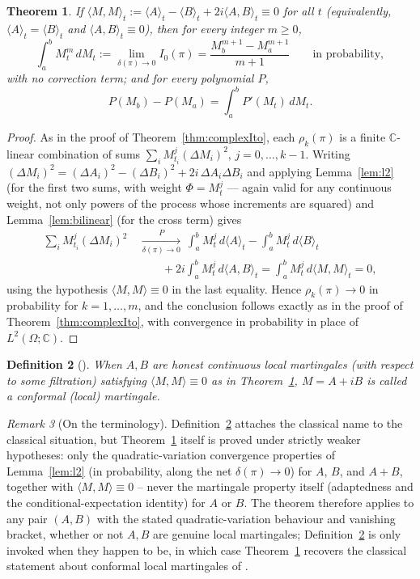 \documentclass[11pt,fleqn]{article}
\def\C{\mathbb C}
\theoremstyle{plain}
\newtheorem{thm}{Theorem}[section]
\newtheorem{definition}[thm]{Definition}
\theoremstyle{remark}
\newtheorem{remark}[thm]{Remark}
\begin{document}
\begin{thm}\label{thm:conformalIto}
If $\langle M,M\rangle_t:=\langle A\rangle_t-\langle B\rangle_t+2i\langle
A,B\rangle_t\equiv0$ for all $t$ (equivalently, $\langle A\rangle_t=
\langle B\rangle_t$ and $\langle A,B\rangle_t\equiv0$), then for every
integer $m\ge0$,
\[
\int_a^b M_t^m\,dM_t:=\lim_{\delta(\pi)\to0}I_0(\pi)=
\frac{M_b^{m+1}-M_a^{m+1}}{m+1}\qquad\text{in probability},
\]
with \emph{no} correction term; and for every polynomial $P$,
\[
P(M_b)-P(M_a)=\int_a^b P'(M_t)\,dM_t.
\]
\end{thm}

\begin{proof}
As in the proof of Theorem~\ref{thm:complexIto}, each $\rho_k(\pi)$ is a
finite $\C$-linear combination of sums $\sum_iM_{t_i}^j(\Delta M_i)^2$,
$j=0,\ldots,k-1$. Writing $(\Delta M_i)^2=(\Delta A_i)^2-(\Delta
B_i)^2+2i\,\Delta A_i\Delta B_i$ and applying Lemma~\ref{lem:l2} (for the
first two sums, with weight $\Phi=M_t^j$ — again valid for any continuous
weight, not only powers of the process whose increments are squared) and
Lemma~\ref{lem:bilinear} (for the cross term) gives
\begin{align*}
\sum_iM_{t_i}^j(\Delta M_i)^2\ &\xrightarrow[\delta(\pi)\to0]{P}\
\int_a^bM_t^j\,d\langle A\rangle_t-\int_a^bM_t^j\,d\langle B\rangle_t\\
&\qquad+2i\int_a^bM_t^j\,d\langle A,B\rangle_t
=\int_a^bM_t^j\,d\langle M,M\rangle_t=0,
\end{align*}
using the hypothesis $\langle M,M\rangle\equiv0$ in the last equality. Hence
$\rho_k(\pi)\to0$ in probability for $k=1,\ldots,m$, and the conclusion
follows exactly as in the proof of Theorem~\ref{thm:complexIto}, with
convergence in probability in place of $L^2(\Omega;\C)$.
\end{proof}

\begin{definition}[\cite{GS}]\label{def:conformal}
When $A,B$ are honest continuous local martingales (with respect to some
filtration) satisfying $\langle M,M\rangle\equiv0$ as in
Theorem~\ref{thm:conformalIto}, $M=A+iB$ is called a \emph{conformal
(local) martingale}.
\end{definition}

\begin{remark}[On the terminology]
Definition~\ref{def:conformal} attaches the classical name to the
classical situation, but Theorem~\ref{thm:conformalIto} itself is proved
under strictly weaker hypotheses: only the quadratic-variation
convergence properties of Lemma~\ref{lem:l2} (in probability, along the
net $\delta(\pi)\to0$) for $A$, $B$, and $A+B$, together with
$\langle M,M\rangle\equiv0$ -- never the martingale property itself
(adaptedness and the conditional-expectation identity) for $A$ or $B$.
The theorem therefore applies to any pair $(A,B)$ with the stated
quadratic-variation behaviour and vanishing bracket, whether or not
$A,B$ are genuine local martingales; Definition~\ref{def:conformal} is
only invoked when they happen to be, in which case
Theorem~\ref{thm:conformalIto} recovers the classical statement about
conformal local martingales of \cite{GS}.
\end{remark}
\end{document}

